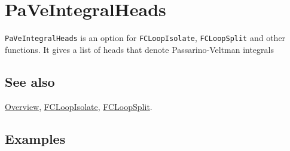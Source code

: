\documentclass[../FeynCalcManual.tex]{subfiles}
\begin{document}
\hypertarget{paveintegralheads}{%
\section{PaVeIntegralHeads}\label{paveintegralheads}}

\texttt{PaVeIntegralHeads} is an option for \texttt{FCLoopIsolate},
\texttt{FCLoopSplit} and other functions. It gives a list of heads that
denote Passarino-Veltman integrals

\subsection{See also}

\hyperlink{toc}{Overview}, \hyperlink{fcloopisolate}{FCLoopIsolate},
\hyperlink{fcloopsplit}{FCLoopSplit}.

\subsection{Examples}
\end{document}
